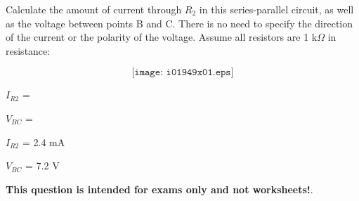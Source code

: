 

Calculate the amount of current through $R_2$ in this series-parallel circuit, as well as the voltage between points B and C.  There is no need to specify the direction of the current or the polarity of the voltage.  Assume all resistors are 1 k$\Omega$ in resistance:

$$\texttt{[image: i01949x01.eps]}$$

$I_{R2}$ = 

\vskip 10pt

$V_{BC}$ = 

\vskip 10pt







$I_{R2}$ = 2.4 mA

\vskip 10pt

$V_{BC}$ = 7.2 V







{\bf This question is intended for exams only and not worksheets!}.


